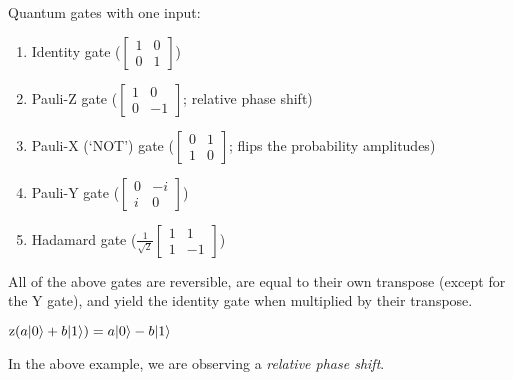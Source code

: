 Quantum gates with one input:
\begin{enumerate}
    \item Identity gate ($\begin{bmatrix}
        1 & 0\\
        0 & 1
    \end{bmatrix}$)
    \item Pauli-Z gate ($\begin{bmatrix}
        1 & 0\\
        0 & -1
    \end{bmatrix}$; relative phase shift)
    \item Pauli-X (`NOT') gate ($\begin{bmatrix}
        0 & 1\\
        1 & 0
    \end{bmatrix}$; flips the probability amplitudes)
    \item Pauli-Y gate ($\begin{bmatrix}
        0 & -i\\
        i & 0
    \end{bmatrix}$)
    \item Hadamard gate ($\frac{1}{\sqrt{2}}\begin{bmatrix}
        1 & 1\\
        1 & -1
    \end{bmatrix}$)
\end{enumerate}
All of the above gates are reversible, are equal to their own transpose (except for the Y gate), and yield the identity gate when multiplied by their transpose.

\begin{example}
    $\mathrm{z}(a\lvert0\rangle + b\lvert1\rangle) = a\lvert0\rangle - b\lvert1\rangle$
\end{example}

\begin{note}
    In the above example, we are observing a \emph{relative phase shift}.
\end{note}

\pagebreak

